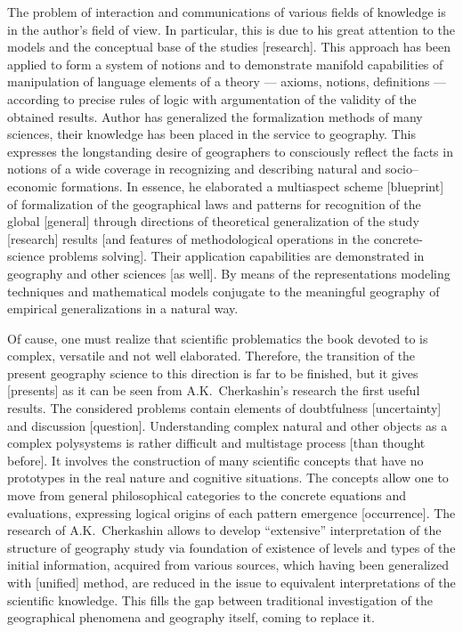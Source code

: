 \documentclass[12pt,leqno]{book}
\numberwithin{equation}{chapter}
\begin{document}
The problem of interaction and communications of various fields of knowledge is in the author's field of view. In particular, this is due to his great attention to the models and the conceptual base of the studies [research]. This approach has been applied to form a system of notions and to demonstrate manifold capabilities of manipulation of language elements of a theory --- axioms, notions, definitions --- according to precise rules of logic with argumentation of the validity of the obtained results. Author has generalized the formalization methods of many sciences, their knowledge has been placed in the service to geography. This expresses the longstanding desire of geographers to consciously reflect the facts in notions of a wide coverage in recognizing and describing natural and socio--economic formations. In essence, he elaborated a multiaspect scheme [blueprint] of formalization of the geographical laws and patterns for recognition of the global [general] through directions of theoretical generalization of the study [research] results [and features of methodological operations in the concrete-science problems solving]. Their application capabilities are demonstrated in geography and other sciences [as well]. By means of the representations modeling techniques and mathematical models conjugate to the meaningful geography of empirical generalizations in a natural way.

Of cause, one must realize that scientific problematics the book devoted to is complex, versatile and not well elaborated. Therefore, the transition of the present geography science to this direction is far to be finished, but it gives [presents] as it can be seen from A.K.~Cherkashin's research the first useful results. The considered problems contain elements of doubtfulness [uncertainty] and discussion [question]. Understanding complex natural and other objects as a complex polysystems is rather difficult and multistage process [than thought before]. It involves the construction of many scientific concepts that have no prototypes in the real nature and cognitive situations. The concepts allow one to move from general philosophical categories to the concrete equations and evaluations, expressing logical origins of each pattern emergence [occurrence]. The research of A.K.~Cherkashin allows to develop ``extensive'' interpretation of the structure of geography study via foundation of existence of levels and types of the initial information, acquired from various sources, which having been generalized with [unified] method, are reduced in the issue to equivalent interpretations of the scientific knowledge. This fills the gap between traditional investigation of the geographical phenomena and geography itself, coming to replace it.
\end{document}
